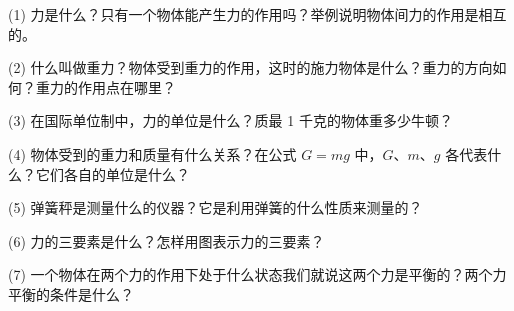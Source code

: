 \label{sec:2-fuxi}

(1) 力是什么？只有一个物体能产生力的作用吗？举例说明物体间力的作用是相互的。

(2) 什么叫做重力？物体受到重力的作用，这时的施力物体是什么？重力的方向如何？重力的作用点在哪里？

(3) 在国际单位制中，力的单位是什么？质最 1 千克的物体重多少牛顿？

(4) 物体受到的重力和质量有什么关系？在公式 $G = mg$ 中，$G$、$m$、$g$ 各代表什么？它们各自的单位是什么？

(5) 弹簧秤是测量什么的仪器？它是利用弹簧的什么性质来测量的？

(6) 力的三要素是什么？怎样用图表示力的三要素？

(7) 一个物体在两个力的作用下处于什么状态我们就说这两个力是平衡的？两个力平衡的条件是什么？

